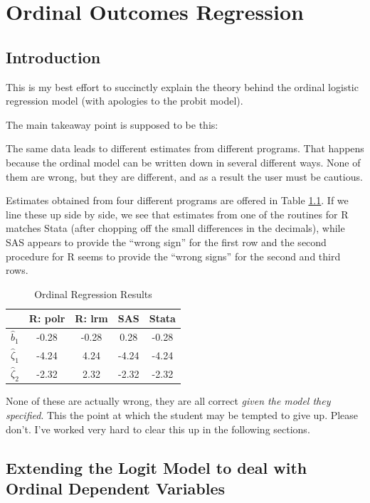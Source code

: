 
\chapter{Ordinal Outcomes Regression}


\section{Introduction}

This is my best effort to succinctly explain the theory behind the
ordinal logistic regression model (with apologies to the probit model). 

The main takeaway point is supposed to be this: 

The same data leads to different estimates from different programs.
That happens because the ordinal model can be written down in several
different ways. None of them are wrong, but they are different, and
as a result the user must be cautious.

Estimates obtained from four different programs are offered in Table
\ref{tab:Ordinal-Regression-Results}. If we line these up side by
side, we see that estimates from one of the routines for R matches
Stata (after chopping off the small differences in the decimals),
while SAS appears to provide the ``wrong sign'' for the first row
and the second procedure for R seems to provide the ``wrong signs''
for the second and third rows.

\begin{table}


\caption{Ordinal Regression Results\label{tab:Ordinal-Regression-Results}}


\centering{}%
\begin{tabular}{|c|c|c|c|c|}
\hline 
 & R: polr & R: lrm & SAS & Stata\tabularnewline
\hline 
\hline 
$\hat{b}_{1}$ & -0.28 & -0.28 & 0.28 & -0.28\tabularnewline
\hline 
$\hat{\zeta}_{1}$ & -4.24 & 4.24 & -4.24 & -4.24\tabularnewline
\hline 
$\hat{\zeta}_{2}$ & -2.32 & 2.32 & -2.32 & -2.32\tabularnewline
\hline 
\end{tabular}
\end{table}


\noindent None of these are actually wrong, they are all correct \emph{given
the model they specified}. This the point at which the student may
be tempted to give up. Please don't. I've worked very hard to clear
this up in the following sections.


\section{Extending the Logit Model to deal with Ordinal Dependent Variables}

